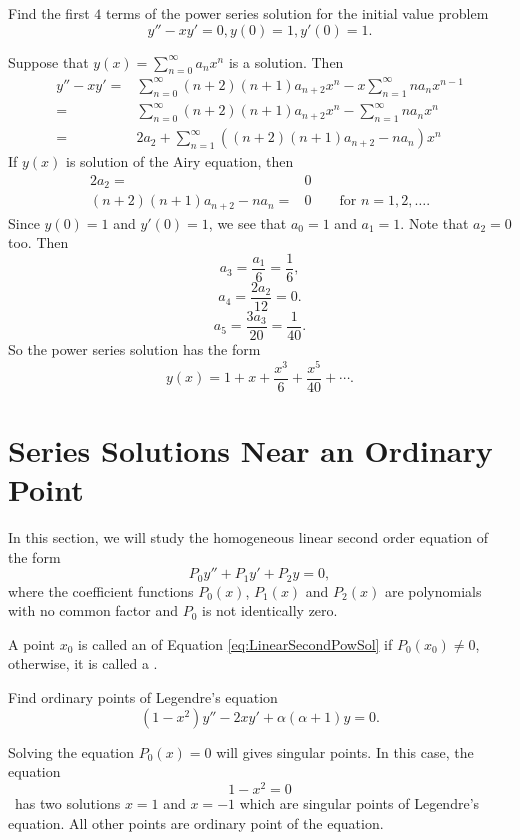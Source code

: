 \begin{exercise}
  Find the first $4$ terms of the power series solution for the initial value problem
  \[y''-xy'=0, y(0)=1, y'(0)=1.\]
\end{exercise}
\begin{exersol}
  Suppose that $y(x)=\sum\limits_{n=0}^\infty a_nx^n$ is a solution. Then
  \[
  \begin{aligned}
    y''-xy'=&\sum_{n=0}^\infty (n+2)(n+1)a_{n+2}x^n - x\sum_{n=1}^\infty n a_n x^{n-1}\\
    =&\sum_{n=0}^\infty (n+2)(n+1)a_{n+2}x^n - \sum_{n=1}^\infty n a_n x^n\\
    =&2a_2+\sum_{n=1}^\infty ((n+2)(n+1)a_{n+2}-n a_n)x^n
  \end{aligned}  
  \]
  If $y(x)$ is solution of the Airy equation, then
  \[
    \begin{aligned}
      2a_2=&0\\  
      (n+2)(n+1)a_{n+2}-na_n=&0 \qquad \text{for } n=1, 2, \dots.
    \end{aligned}
  \]
  Since $y(0)=1$ and $y'(0)=1$, we see that $a_0=1$ and $a_1=1$. Note that $a_2=0$ too. Then
  \[a_3=\frac{a_1}{6}=\frac16,\]
  \[a_4=\frac{2a_2}{12}=0.\]
  \[a_5=\frac{3a_3}{20}=\frac{1}{40}.\]
So the power series solution has the form
\[y(x)=1+x+\frac{x^3}{6}+\frac{x^5}{40}+\cdots.\]
\end{exersol}

\section{Series Solutions Near an Ordinary Point}

In this section, we will study the homogeneous linear second order equation of the form
\begin{equation}\label{eq:LinearSecondPowSol}
  P_0y''+P_1y'+P_2y=0,
\end{equation}
where the coefficient functions $P_0(x)$, $P_1(x)$ and $P_2(x)$ are polynomials with no common factor and $P_0$ is not identically zero.

A point $x_0$ is called an  of Equation \ref{eq:LinearSecondPowSol} if $P_0(x_0)\neq 0$, otherwise, it is called a .

\begin{example}
  Find ordinary points of Legendre's equation
  \[(1-x^2)y''-2xy'+\alpha(\alpha+1)y=0.\]
\end{example}
\begin{solution}
  Solving the equation $P_0(x)=0$ will gives singular points. In this case, the equation
  \[1-x^2=0\]\
  has two solutions $x=1$ and $x=-1$ which are singular points of Legendre's equation. All other points are ordinary point of the equation.
\end{solution}

